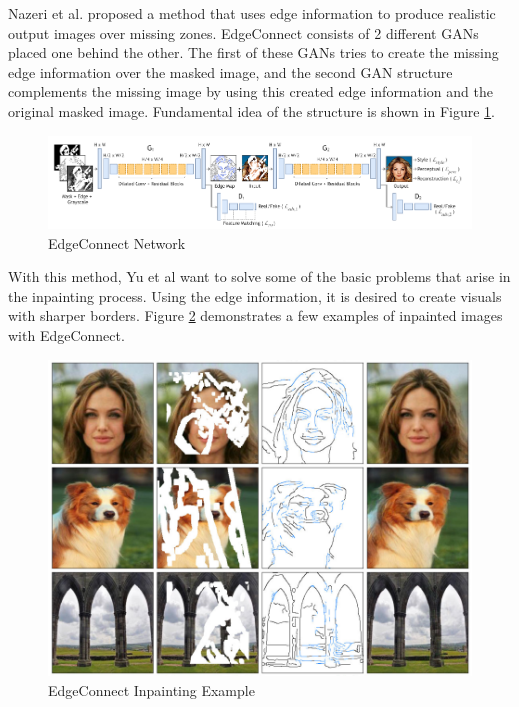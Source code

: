 Nazeri et al. proposed a method \cite{edgeconnect} that uses edge information to produce realistic output images over missing zones.  EdgeConnect consists of 2 different GANs placed one behind the other. The first of these GANs tries to create the missing edge information over the masked image, and the second GAN structure complements the missing image by using this created edge information and the original masked image. Fundamental idea of the structure is shown in Figure \ref{fig:edgeconnect-network}.

\begin{figure}[h]
    \centering
    \includegraphics[scale=0.6]{figures/chapter4/EdgeConnect.PNG}
    \caption{EdgeConnect Network}
    \label{fig:edgeconnect-network}
\end{figure}

With this method, Yu et al want to solve some of the basic problems that arise in the inpainting process. Using the edge information, it is desired to create visuals with sharper borders. Figure \ref{fig:edgeconnect-example} demonstrates a few examples of inpainted images with EdgeConnect.

\begin{figure}[h]
    \centering
    \includegraphics[scale=0.85]{figures/chapter4/ExampleEdgeConnect.PNG}
    \caption{EdgeConnect Inpainting Example}
    \label{fig:edgeconnect-example}
\end{figure}


